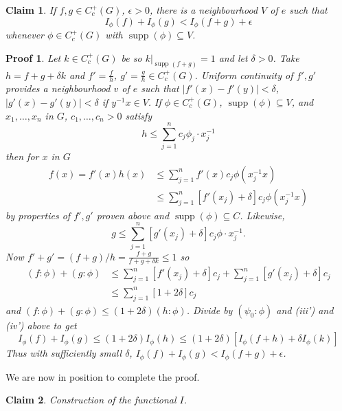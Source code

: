 \documentclass[11pt, a4paper]{memoir}
\theoremstyle{change}
\theoremstyle{plain}
\newtheorem{claim}{Claim}
\theoremstyle{nonumberplain}
\newtheorem{nmproof}{Proof}
\DeclareMathOperator{\supp}{supp}
\numberwithin{equation}{section}
\begin{document}
\begin{claim}\label{cl:1a}
    If $f,g\in C_c^+(G)$, $\epsilon>0$, there is a neighbourhood $V$ of $e$ such that
    \begin{equation*}
        I_\phi(f)+I_\phi(g)<I_\phi(f+g)+\epsilon
    \end{equation*}
    whenever $\phi\in C_c^+(G)$ with $\supp(\phi)\subseteq V$.
\end{claim}
\begin{nmproof}
    Let $k\in C_c^+(G)$ be so $k|_{\supp(f+g)}=1$ and let $\delta>0$.
    Take $h=f+g+\delta k$ and $f'=\frac{f}{h}$, $g'=\frac{g}{h}\in C_c^+(G)$.
    Uniform continuity of $f',g'$ provides a neighbourhood $v$ of $e$ such that $|f'(x)-f'(y)|<\delta$, $|g'(x)-g'(y)|<\delta$ if $y^{-1}x\in V$.
    If $\phi\in C_c^+(G)$, $\supp(\phi)\subseteq V$, and $x_1,\ldots,x_n$ in $G$, $c_1,\ldots,c_n>0$ satisfy
    \begin{equation*}
        h\leq\sum_{j=1}^n c_j\phi_j\cdot x_j^{-1}
    \end{equation*}
    then for $x$ in $G$
    \begin{align*}
        f(x) = f'(x)h(x) &\leq\sum_{j=1}^n f'(x)c_j\phi(x_j^{-1}x)\\
                         &\leq\sum_{j=1}^n[f'(x_j)+\delta]c_j\phi(x_j^{-1}x)
    \end{align*}
    by properties of $f',g'$ proven above and $\supp(\phi)\subseteq C$.
    Likewise,
    \begin{equation*}
        g\leq\sum_{j=1}^n[g'(x_j)+\delta]c_j\phi\cdot x_j^{-1}.
    \end{equation*}
    Now $f'+g'=(f+g)/h=\frac{f+g}{f+g+\delta k}\leq 1$ so
    \begin{align*}
        (f:\phi)+(g:\phi)&\leq\sum_{j=1}^n[f'(x_j)+\delta]c_j+\sum_{j=1}^n[g'(x_j)+\delta]c_j\\
                         &\leq\sum_{j=1}^n[1+2\delta]c_j
    \end{align*}
    and $(f:\phi)+(g:\phi)\leq (1+2\delta)(h:\phi)$.
    Divide by $(\psi_0:\phi)$ and (iii') and (iv') above to get
    \begin{equation*}
        I_\phi(f)+I_\phi(g)\leq(1+2\delta)I_\phi(h)\leq(1+2\delta)[I_\phi(f+h)+\delta I_\phi(k)]
    \end{equation*}
    Thus with sufficiently small $\delta$, $I_\phi(f)+I_\phi(g)<I_\phi(f+g)+\epsilon$.
\end{nmproof}
We are now in position to complete the proof.
\begin{claim}\label{cl:i2}
    Construction of the functional $I$.
\end{claim}
\end{document}
